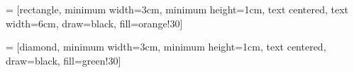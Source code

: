  = [rectangle, minimum width=3cm, minimum height=1cm, text centered, text width=6cm, draw=black, fill=orange!30]

 = [diamond, minimum width=3cm, minimum height=1cm, text centered, draw=black, fill=green!30]






\begin{comment}

    \begin{center} \begin{tikzpicture}[ baseline=0, node distance=1.5cm]
        \node (start) [flowchart-start] {P - Q};
        \node (S1) [flowchart-process, below of=start] { Q1 = 1's complement of Q };
        \node (S2) [flowchart-process, below of=S1] { R = P + Q1 };
        \node (S3) [flowchart-decision, below of=S2, yshift=-0.5cm] { Carry? };xx
        \node (S4) [flowchart-start, below left=2cm of S3] { Result = R + carry};
        \node (S5) [flowchart-start, below right=2cm of S3] {Result = R1};

        \draw [flowchart-arrow] (start) -- (S1); \draw [flowchart-arrow] (S1) -- (S2); \draw [flowchart-arrow] (S2) -- (S3);
        \draw [flowchart-arrow] (S3.west) -| node[right of= S3, xshift=-1cm, yshift=0.2cm] {Yes} (S4.north);
        \draw [flowchart-arrow] (S3.east) -| node[right of= S3, xshift=-3cm, yshift=0.2cm] {No} (S5.north);

    \end{tikzpicture} \end{center}


    \matrix [draw=white,column sep=0cm]
    {
        \node[draw=black!60] {8}; & \node[draw=black!60]{1}; & \node[draw=black!60] {6}; \\
        \node[draw=blue!60] {8}; & \node[draw=blue!60]{1}; & \node[draw=blue!60] {6}; \\
    };


\end{comment}
